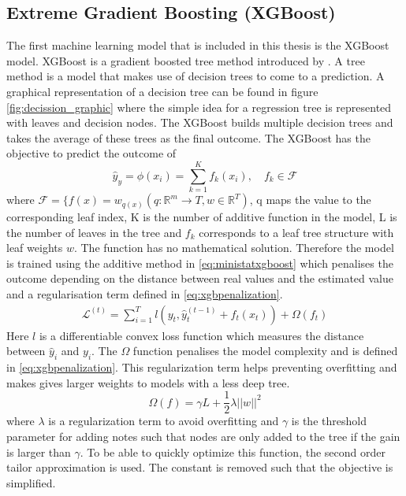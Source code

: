 \subsection{Extreme Gradient Boosting (XGBoost)}
\label{subseq:xgb}
The first machine learning model that is included in this thesis is the XGBoost model. XGBoost is a gradient boosted tree method introduced by \cite{Chen2016XGBoost:System}. A tree method is a model that makes use of decision trees to come to a prediction. A graphical representation of a decision tree can be found in figure \ref{fig:decission_graphic} where the simple idea for a regression tree is represented with leaves and decision nodes. The XGBoost builds multiple decision trees and takes the average of these trees as the final outcome. The XGBoost has the objective to predict the outcome of
\begin{equation}
\label{eq:xgbpredictionfunc}
    \hat{y}_y = \phi(x_i) = \sum\limits_{k=1}^K f_k(x_i), \quad f_k \in \mathcal{F}
\end{equation}
where $\mathcal{F} = \{f(x)=w_{q(x)}(q:\mathbb{R}^m \to T, w \in \mathbb{R}^T)$, q maps the value to the corresponding leaf index, K is the number of additive function in the model, L is the number of leaves in the tree and $f_k$ corresponds to a leaf tree structure with leaf weights $w$. The function has no mathematical solution. Therefore the model is trained using the additive method in \eqref{eq:ministatxgboost} which penalises the outcome depending on the distance between real values and the estimated value and a regularisation term defined in \ref{eq:xgbpenalization}.
\begin{equation}
\label{eq:ministatxgboost}
\begin{gathered}
    \mathcal{L}^{(t)} = \sum\limits_{i=1}^T l(y_t, \hat{y}_t^{(t-1)} + f_t(x_t)) + \Omega(f_t)
\end{gathered}
\end{equation}
Here $l$ is a differentiable convex loss function which measures the distance between $\hat{y}_i$ and $y_i$. The $\Omega$ function penalises the model complexity and is defined in \eqref{eq:xgbpenalization}. This regularization term helps preventing overfitting and makes gives larger weights to models with a less deep tree.
\begin{equation}
\label{eq:xgbpenalization}
    \Omega(f) = \gamma L + \frac{1}{2} \lambda ||w||^2
\end{equation}
where $\lambda$ is a regularization term to avoid overfitting and $\gamma$ is the threshold parameter for adding notes such that nodes are only added to the tree if the gain is larger than $\gamma$. To be able to quickly optimize this function, the second order tailor approximation is used. The constant is removed such that the objective is simplified.
